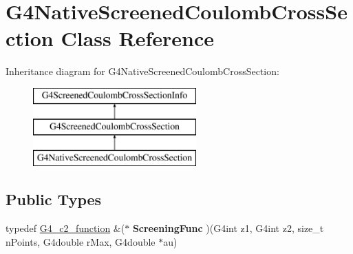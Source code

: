 \hypertarget{classG4NativeScreenedCoulombCrossSection}{\section{G4\-Native\-Screened\-Coulomb\-Cross\-Section Class Reference}
\label{classG4NativeScreenedCoulombCrossSection}
}
Inheritance diagram for G4\-Native\-Screened\-Coulomb\-Cross\-Section\-:\begin{figure}[H]
\begin{center}
\leavevmode
\includegraphics[height=3.000000cm]{classG4NativeScreenedCoulombCrossSection}
\end{center}
\end{figure}
\subsection*{Public Types}
\begin{DoxyCompactItemize}
\item 
\hypertarget{classG4NativeScreenedCoulombCrossSection_a1e61831d0b46e8fe3206846611888a0d}{typedef \hyperlink{classc2__function}{G4\-\_\-c2\-\_\-function} \&($\ast$ {\bfseries Screening\-Func} )(G4int z1, G4int z2, size\-\_\-t n\-Points, G4double r\-Max, G4double $\ast$au)}\label{classG4NativeScreenedCoulombCrossSection_a1e61831d0b46e8fe3206846611888a0d}

\end{DoxyCompactItemize}
